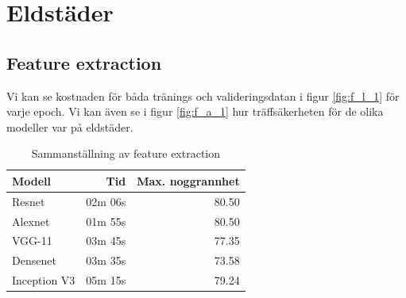 \documentclass[]{kththesis}
\begin{document}
\section{Eldstäder}

\subsection{Feature extraction}
Vi kan se kostnaden för båda tränings och valideringsdatan i figur \ref{fig:f_l_1} för varje epoch. Vi kan även se i figur \ref{fig:f_a_1} hur träffsäkerheten för de olika modeller var på eldstäder.

\begin{table}
  \centering
  \begin{tabular}{|l|r|r|}
    Modell & Tid & Max. noggrannhet \\ 
    \hline
    Resnet       & 02m 06s & 80.50 \\
    Alexnet      & 01m 55s & 80.50 \\
    VGG-11       & 03m 45s & 77.35 \\
    Densenet     & 03m 35s & 73.58 \\
    Inception V3 & 05m 15s & 79.24 \\
  \end{tabular}
  \caption{Sammanställning av feature extraction}
\end{table}
\end{document}
